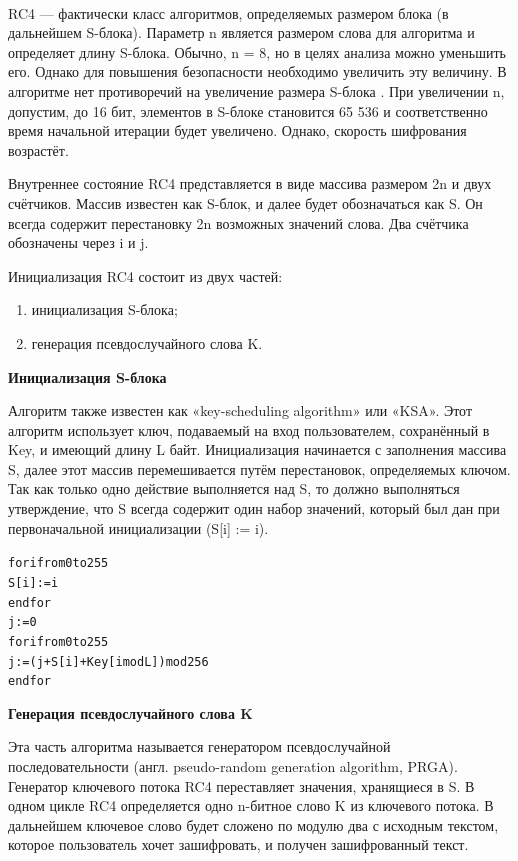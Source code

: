 \documentclass[a4paper]{report}
\begin{document}
~

RC4 — фактически класс алгоритмов, определяемых размером блока (в дальнейшем S-блока). Параметр n является размером слова для алгоритма и определяет длину S-блока. Обычно, n = 8, но в целях анализа можно уменьшить его. Однако для повышения безопасности необходимо увеличить эту величину. В алгоритме нет противоречий на увеличение размера S-блока . При увеличении n, допустим, до 16 бит, элементов в S-блоке становится 65 536 и соответственно время начальной итерации будет увеличено. Однако, скорость шифрования возрастёт.

Внутреннее состояние RC4 представляется в виде массива размером 2n и двух счётчиков. Массив известен как S-блок, и далее будет обозначаться как S. Он всегда содержит перестановку 2n возможных значений слова. Два счётчика обозначены через i и j.

Инициализация RC4 состоит из двух частей:
\begin{enumerate}
\item инициализация S-блока;
\item генерация псевдослучайного слова K.
\end{enumerate}

\textbf{Инициализация S-блока}

Алгоритм также известен как «key-scheduling algorithm» или «KSA». Этот алгоритм использует ключ, подаваемый на вход пользователем, сохранённый в Key, и имеющий длину L байт. Инициализация начинается с заполнения массива S, далее этот массив перемешивается путём перестановок, определяемых ключом. Так как только одно действие выполняется над S, то должно выполняться утверждение, что S всегда содержит один набор значений, который был дан при первоначальной инициализации (S[i] := i).

\begin{alltt}
		for i from 0 to 255
    		S[i] := i
		endfor
		j := 0
		for i from 0 to 255
    		j := ( j + S[i] + Key[ i mod L ] ) mod 256
		endfor
\end{alltt}




\textbf{Генерация псевдослучайного слова K}

Эта часть алгоритма называется генератором псевдослучайной последовательности (англ. pseudo-random generation algorithm, PRGA). Генератор ключевого потока RC4 переставляет значения, хранящиеся в S. В одном цикле RC4 определяется одно n-битное слово K из ключевого потока. В дальнейшем ключевое слово будет сложено по модулю два с исходным текстом, которое пользователь хочет зашифровать, и получен зашифрованный текст.
\end{document}
